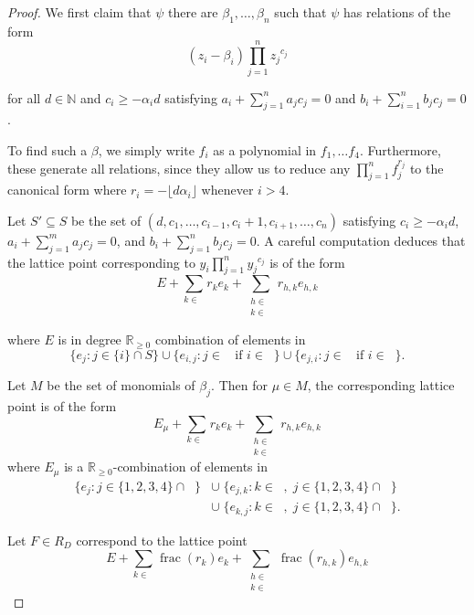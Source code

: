 \documentclass{amsart}
\theoremstyle{plain}
\theoremstyle{definition}
\theoremstyle{remark}
\numberwithin{equation}{section}
\newcommand\bida{a}
\newcommand\bidb{b}
\DeclareMathOperator{\fr}{frac}
\DeclareMathOperator{\Te}{T_=}
\DeclareMathOperator{\Tp}{T_+}
\DeclareMathOperator{\Tm}{T_-}
\begin{document}
\begin{proof}
We first claim that $\psi$ there are $\beta_1, \ldots, \beta_n$ such that $\psi$ has relations of the form
\begin{equation}
\label{eqn:hirz-relations-psi}
	(z_i - \beta_i)\prod_{j=1}^n {z_j}^{c_{j}}
\end{equation}

\noindent
for all $d \in \mathbb{N}$ and $c_i \ge -\alpha_i d$ satisfying $\bida_i + \sum_{j = 1}
^n \bida_j c_j = 0$ and $\bidb_i + \sum_{i=1}^n \bidb_j c_j = 0$.

To find such a $\beta$, we simply write $f_i$ as a 
polynomial in $f_1, \ldots f_4$. Furthermore, these
generate all relations, since they allow us to reduce any $\prod_{j =
1}^n f_j^{r_j}$ to the canonical form where $r_i = - \lfloor d \alpha_i \rfloor$ whenever $i > 4$.

Let $S'\subseteq S$ be the
set of $(d, c_1, \ldots, c_{i-1}, c_i + 1, c_{i+1}, \ldots , c_n)$ satisfying $c_i \ge -\alpha_i d$,
$\bida_i + \sum_{j = 1}^m \bida_j c_j = 0$, and $\bidb_i + \sum_{j=1}^n \bidb_j c_j
= 0$.  A careful computation deduces that the lattice point corresponding to $y_i \prod_{j=1}^n {y_j}^{c_j}$ is of the form 
\[
	E + \sum_{k\in \Te} r_k e_k + \sum_{\substack{h \in \Tp \\ k \in \Tm}} r_{h,k} e_{h,k}
\] 

\noindent
where $E$ is in degree $\mathbb{R}_{\ge 0}$
combination of elements in 
\[
	\{e_j: j\in \{i\} \cap S\} \cup \{e_{i, j}: j \in \Tm \mbox{ if }
	i	\in \Tp \} \cup \{e_{j, i}: j \in \Tp \mbox{ if } i \in \Tm \}.
\]


Let $M$ be the set of monomials of $\beta_j$.  Then for $\mu\in M$, the corresponding lattice point is of the form
\[
	E_\mu + \sum_{k\in \Te} r_k e_k + \sum_{\substack{
	h \in \Tp \\ k \in \Tm}} r_{h,k} e_{h,k}
\]
where $E_\mu$ is a $\mathbb{R}_{\ge 0}$-combination of elements in
\begin{align*}
	\{e_j : j \in \{1, 2, 3, 4\} \cap \Te\}
	&\cup \; \{e_{j, k}: k \in \Tm, \; j \in \{1, 2, 3, 4\} \cap \Te\} \\
	&\cup \; \{e_{k, j}: k \in \Tp, \; j \in \{1, 2, 3, 4\} \cap \Tm\}.
\end{align*}

Let $F \in R_D$ correspond to the lattice point
\[
	E + \sum_{k \in \Te} \fr(r_k) e_k + \sum_{\substack{h \in \Tp \\
	k \in \Tm}} \fr(r_{h,k}) e_{h,k}
\]


\end{proof}
\end{document}

